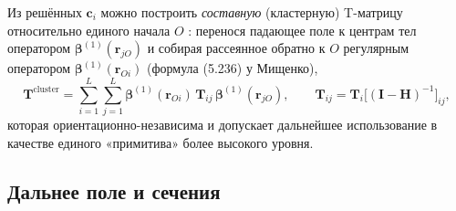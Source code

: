 \documentclass[11pt,a4paper]{article}
\begin{document}
Из решённых $\bm{c}_i$ можно построить \emph{составную} (кластерную) T-матрицу относительно единого начала $O$ \cite{mishchenko2002}: перенося падающее поле к центрам тел оператором $\bm{\beta}^{(1)}(\bm{r}_{jO})$ и собирая рассеянное обратно к $O$ регулярным оператором $\bm{\beta}^{(1)}(\bm{r}_{Oi})$ (формула (5.236) у Мищенко),
\begin{equation}
\mathbf{T}^{\mathrm{cluster}}
=\sum_{i=1}^{L}\sum_{j=1}^{L}
\bm{\beta}^{(1)}(\bm{r}_{Oi})\,\mathbf{T}_{ij}\,\bm{\beta}^{(1)}(\bm{r}_{jO}),
\qquad
\mathbf{T}_{ij}=\mathbf{T}_i\bigl[(\mathbf{I}-\mathbf{H})^{-1}\bigr]_{ij},
\label{tmatrix-eq:tm-cluster}
\end{equation}
которая ориентационно-независима и допускает дальнейшее использование в качестве единого «примитива» более высокого уровня.

\subsection{Дальнее поле и сечения}
\label{tmatrix-sec:tm-farfield}
\end{document}
